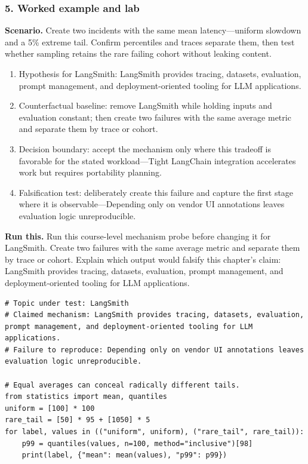 \subsubsection*{5. Worked example and lab}
\textbf{Scenario.} Create two incidents with the same mean latency—uniform slowdown and a 5\% extreme tail. Confirm percentiles and traces separate them, then test whether sampling retains the rare failing cohort without leaking content.
\begin{enumerate}
\item Hypothesis for LangSmith: LangSmith provides tracing, datasets, evaluation, prompt management, and deployment-oriented tooling for LLM applications.
\item Counterfactual baseline: remove LangSmith while holding inputs and evaluation constant; then create two failures with the same average metric and separate them by trace or cohort.
\item Decision boundary: accept the mechanism only where this tradeoff is favorable for the stated workload—Tight LangChain integration accelerates work but requires portability planning.
\item Falsification test: deliberately create this failure and capture the first stage where it is observable—Depending only on vendor UI annotations leaves evaluation logic unreproducible.
\end{enumerate}
\textbf{Run this.} Run this course-level mechanism probe before changing it for LangSmith. Create two failures with the same average metric and separate them by trace or cohort. Explain which output would falsify this chapter's claim: LangSmith provides tracing, datasets, evaluation, prompt management, and deployment-oriented tooling for LLM applications.
\begin{Verbatim}[fontsize=\scriptsize]
# Topic under test: LangSmith
# Claimed mechanism: LangSmith provides tracing, datasets, evaluation, prompt management, and deployment-oriented tooling for LLM applications.
# Failure to reproduce: Depending only on vendor UI annotations leaves evaluation logic unreproducible.

# Equal averages can conceal radically different tails.
from statistics import mean, quantiles
uniform = [100] * 100
rare_tail = [50] * 95 + [1050] * 5
for label, values in (("uniform", uniform), ("rare_tail", rare_tail)):
    p99 = quantiles(values, n=100, method="inclusive")[98]
    print(label, {"mean": mean(values), "p99": p99})
\end{Verbatim}
